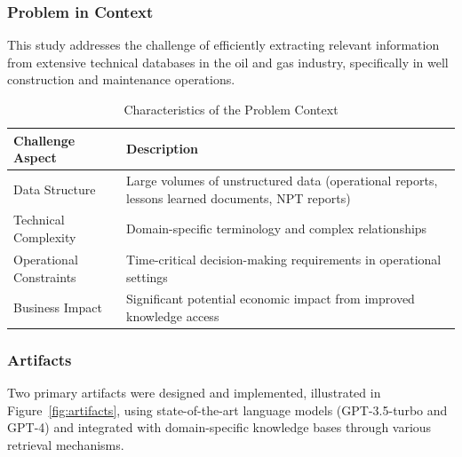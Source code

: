         \subsubsection{Problem in Context}
        
        This study addresses the challenge of efficiently extracting relevant information from extensive technical databases in the oil and gas industry, specifically in well construction and maintenance operations. 
        
        \begin{table}[h]
            \centering
            \caption{Characteristics of the Problem Context}
            \begin{tabular}{|p{}|p{}|}
            \hline
            \textbf{Challenge Aspect} & \textbf{Description} \\
            \hline
            Data Structure & Large volumes of unstructured data (operational reports, lessons learned documents, NPT reports) \\
            \hline
            Technical Complexity & Domain-specific terminology and complex relationships \\
            \hline
            Operational Constraints & Time-critical decision-making requirements in operational settings \\
            \hline
            Business Impact & Significant potential economic impact from improved knowledge access \\
            \hline
            \end{tabular}
            \label{tab:problem-context}
        \end{table}
        
        \subsubsection{Artifacts}
        
        Two primary artifacts were designed and implemented, illustrated in Figure~\ref{fig:artifacts}, using state-of-the-art language models (GPT-3.5-turbo and GPT-4) and integrated with domain-specific knowledge bases through various retrieval mechanisms.
        
